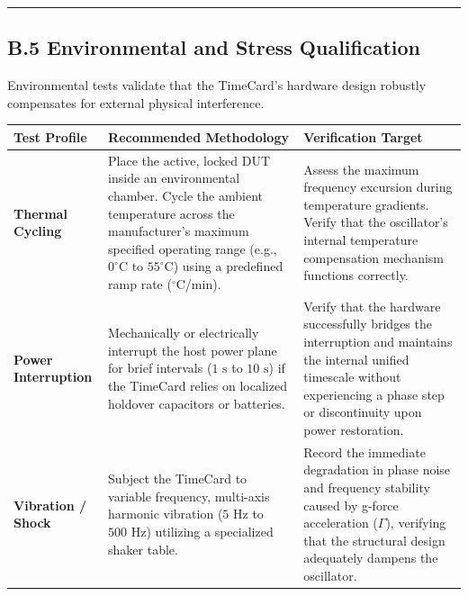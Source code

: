 \documentclass[
]{article}
\newcounter{none} %
\begin{document}
\begin{center}\rule{0.5\linewidth}{0.5pt}\end{center}

\subsection{B.5 Environmental and Stress
Qualification}\label{b.5-environmental-and-stress-qualification}

Environmental tests validate that the TimeCard's hardware design
robustly compensates for external physical interference.

{\def\LTcaptype{none} %
\begin{longtable}[]{@{}
  >{\raggedright\arraybackslash}p{}
  >{\raggedright\arraybackslash}p{}
  >{\raggedright\arraybackslash}p{}@{}}
\toprule\noalign{}
Test Profile & Recommended Methodology & Verification Target \\
\midrule\noalign{}
\endhead
\bottomrule\noalign{}
\endlastfoot
\textbf{Thermal Cycling} & Place the active, locked DUT inside an
environmental chamber. Cycle the ambient temperature across the
manufacturer's maximum specified operating range (e.g.,
\(0^\circ\text{C}\) to \(55^\circ\text{C}\)) using a predefined ramp
rate (\(^\circ\text{C}\)/min). & Assess the maximum frequency excursion
during temperature gradients. Verify that the oscillator's internal
temperature compensation mechanism functions correctly. \\
\textbf{Power Interruption} & Mechanically or electrically interrupt the
host power plane for brief intervals (\(1\text{ s}\) to \(10\text{ s}\))
if the TimeCard relies on localized holdover capacitors or batteries. &
Verify that the hardware successfully bridges the interruption and
maintains the internal unified timescale without experiencing a phase
step or discontinuity upon power restoration. \\
\textbf{Vibration / Shock} & Subject the TimeCard to variable frequency,
multi-axis harmonic vibration (\(5\text{ Hz}\) to \(500\text{ Hz}\))
utilizing a specialized shaker table. & Record the immediate degradation
in phase noise and frequency stability caused by g-force acceleration
(\(\Gamma\)), verifying that the structural design adequately dampens
the oscillator. \\
\end{longtable}
}
\end{document}
